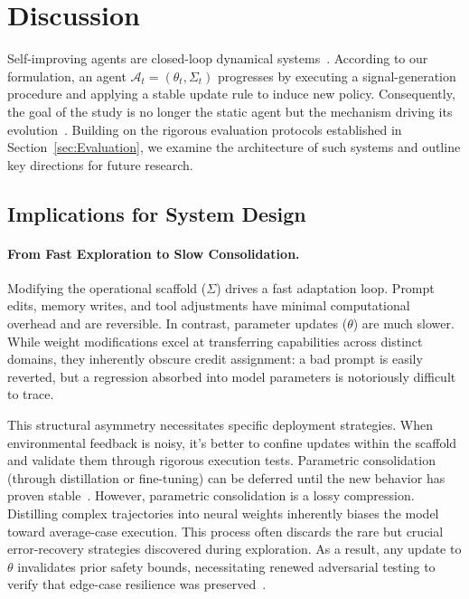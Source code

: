 \section{Discussion}
\label{sec:Discussion}
Self-improving agents are closed-loop dynamical systems~\citep{xie2024osworldbenchmarkingmultimodalagents}. According to our formulation, an agent $\mathcal{A}_t=(\theta_t, \Sigma_t)$ progresses by executing a signal-generation procedure and applying a stable update rule to induce new policy. Consequently, the goal of the study is no longer the static agent but the mechanism driving its evolution~\citep{yampolskiy2015seed, robeyns2025selfimprovingcodingagent, pan2025trainingsoftwareengineeringagents}. Building on the rigorous evaluation protocols established in Section~\ref{sec:Evaluation}, we examine the architecture of such systems and outline key directions for future research.


\subsection{Implications for System Design}
\label{sec:Discussion_Implications}
\paragraph{From Fast Exploration to Slow Consolidation.}
Modifying the operational scaffold ($\Sigma$) drives a fast adaptation loop. Prompt edits, memory writes, and tool adjustments have minimal computational overhead and are reversible. In contrast, parameter updates ($\theta$) are much slower. While weight modifications excel at transferring capabilities across distinct domains, they inherently obscure credit assignment: a bad prompt is easily reverted, but a regression absorbed into model parameters is notoriously difficult to trace.


This structural asymmetry necessitates specific deployment strategies. When environmental feedback is noisy, it's better to confine updates within the scaffold and validate them through rigorous execution tests.  Parametric consolidation (through distillation or fine-tuning) can be deferred until the new behavior has proven stable~\citep{qiu2025agentdistilltrainingfreeagentdistillation, lyu2025correctionmasteryreinforceddistillation}. However, parametric consolidation is a lossy compression. Distilling complex trajectories into neural weights inherently biases the model toward average-case execution. This process often discards the rare but crucial error-recovery strategies discovered during exploration. As a result, any update to $\theta$ invalidates prior safety bounds, necessitating renewed adversarial testing to verify that edge-case resilience was preserved~\citep{dou2025rerestreflectionreinforcedselftraininglanguage, wu2024avataroptimizingllmagents}.


